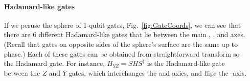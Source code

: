  



\paragraph{Hadamard-like gates}
If we peruse the sphere of 1-qubit gates, Fig.~\ref{fig:GateCoords}, we can see that there are 6 different Hadamard-like gates that lie between the main , , and  axes. (Recall that gates on opposite sides of the sphere's surface are the same up to phase.) Each of these gates can be obtained from straightforward transform so the Hadamard gate. For instance, $H_{YZ} = S H S^\dagger$ is the Hadamard-like gate between the $Z$ and $Y$ gates, which interchanges the  and  axies, and flips the -axis.



